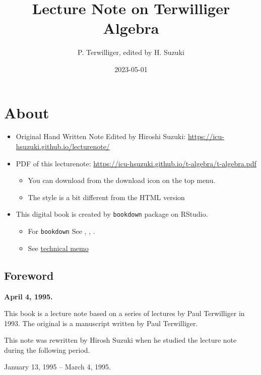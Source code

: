\documentclass[
]{book}
\title{Lecture Note on Terwilliger Algebra}
\author{P. Terwilliger, edited by H. Suzuki}
\date{2023-05-01}
\providecommand{\tightlist}{%
  \setlength{\itemsep}{0pt}\setlength{\parskip}{0pt}}
\theoremstyle{definition}
\theoremstyle{definition}
\theoremstyle{definition}
\theoremstyle{definition}
\theoremstyle{remark}
\begin{document}
\maketitle

{
\setcounter{tocdepth}{1}
\tableofcontents
}
\hypertarget{about}{%
\chapter*{About}\label{about}}

\begin{itemize}
\tightlist
\item
  Original Hand Written Note Edited by Hiroshi Suzuki: \url{https://icu-hsuzuki.github.io/lecturenote/}
\item
  PDF of this lecturenote: \url{https://icu-hsuzuki.github.io/t-algebra/t-algebra.pdf}

  \begin{itemize}
  \tightlist
  \item
    You can download from the download icon on the top menu.
  \item
    The style is a bit different from the HTML version
  \end{itemize}
\item
  This digital book is created by \texttt{bookdown} package on RStudio.

  \begin{itemize}
  \tightlist
  \item
    For \texttt{bookdown} See \citep{xie2015}, \citep{xie2017}, \citep{xie2018}.
  \item
    See \protect\hyperlink{memo}{technical memo}
  \end{itemize}
\end{itemize}

\hypertarget{foreword}{%
\section*{Foreword}\label{foreword}}

\textbf{April 4, 1995.}

This book is a lecture note based on a series of lectures by Paul Terwilliger in 1993. The original is a manuscript written by Paul Terwilliger.

This note was rewritten by Hirosh Suzuki when he studied the lecture note during the following period.

January 13, 1995 -- March 4, 1995.
\end{document}
